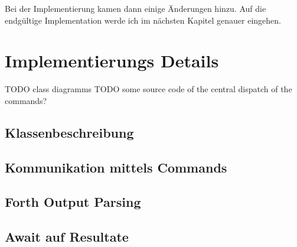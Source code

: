 Bei der Implementierung kamen dann einige Änderungen hinzu. Auf die endgültige Implementation werde ich im nächsten Kapitel genauer eingehen.

\section{Implementierungs Details}

TODO class diagramms
TODO some source code of the central dispatch of the commands?

\subsection{Klassenbeschreibung}

\subsection{Kommunikation mittels Commands}

\subsection{Forth Output Parsing}

\subsection{Await auf Resultate}


